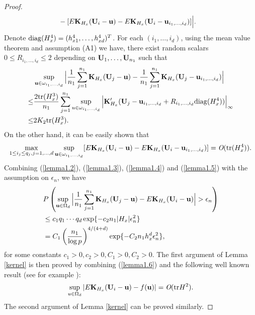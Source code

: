 \documentclass[11pt]{article}
\theoremstyle{definition}
\begin{document}
\begin{proof}
\begin{align}
 		&-[E{\bf K}_{H_x}({\bf U}_i-{\bf u})-E{\bf K}_{H_x}({\bf U}_i-{\bf u}_{i_1,\ldots,i_d})] \Big|. \nonumber
 	\end{align}
 	Denote ${\rm diag}(H^4_x)=(h^4_{x1},\ldots,h_{xd}^4)^T$. For each $(i_1,\ldots,i_d)$, using the mean value theorem and assumption (A1) we have, there exist random scalars $0\leq R_{i_1,\ldots,i_d}\leq 2$ depending on ${\bf U}_1,\ldots,{\bf U}_{n_1}$ such that
 	\begin{align}\label{lemma1.4}
 		&\sup_{{\bf u}\in\omega_{i_1,\ldots,i_d}}\Big|\frac{1}{n_1}\sum_{j=1}^{n_1}{\bf K}_{H_x}({\bf U}_j-{\bf u})-\frac{1}{n_1}\sum_{j=1}^{n_1}{\bf K}_{H_x}({\bf U}_j-{\bf u}_{i_1,\ldots,i_d}) \Big|   \\
 		\leq& \frac{2{\rm tr}(H^3_x)}{n_1}\sum_{j=1}^{n_1} \sup_{u\in\omega_{i_1,\ldots,i_d}}\Big|{\bf K}'_{H_x}({\bf U}_j-{\bf u}_{i_1,\ldots,i_d}+R_{i_1,\ldots,i_d}{\rm diag}(H_x^4))  \Big|_\infty \nonumber\\
 		\leq& 2K_2{\rm tr}(H^3_x). \nonumber
 	\end{align}
 	On the other hand, it can be easily shown that
 	\begin{equation}\label{lemma1.5}
 		\max_{1\leq i_j \leq q_j, j=1,\ldots,d}\sup_{{\bf u}\in\omega_{i_1,\ldots,i_d}}[E{\bf K}_{H_x}({\bf U}_i-{\bf u})-E{\bf K}_{H_x}({\bf U}_i-{\bf u}_{i_1,\ldots,i_d})] =\emph{O}({\rm tr}(H^4_x)).
 	\end{equation}
 	Combining (\ref{lemma1.2}), (\ref{lemma1.3}), (\ref{lemma1.4}) and (\ref{lemma1.5}) with the assumption on $\epsilon_n$, we have%
 	\begin{align}\label{lemma1.6}
 		&P\left(\sup_{{\bf u}\in \Omega_d}\Big|\frac{1}{n_1}\sum_{j=1}^{n_1}{\bf K}_{H_x}({\bf U}_j-{\bf u})-E{\bf K}_{H_x}({\bf U}_i-{\bf u})\Big|>\epsilon_n \right)  \\
 		&\leq c_1q_1\cdots q_d \exp\{-c_2n_1|H_x|\epsilon_n^2\}  \nonumber\\
 		&=C_1\left(\frac{n_1}{\log p}\right)^{4/(4+d)}\exp\{-C_2n_1h_x^{d}\epsilon_n^2\}, \nonumber
 	\end{align}
 	for  some constants $c_1>0, c_2>0, C_1>0, C_2>0$. %
 	The first argument of Lemma \ref{kernel} is then proved by combining (\ref{lemma1.6}) and the following well known result (see for example \cite{Pagan}):
 	\begin{eqnarray*}
 		\sup_{u\in \Omega_d}|E{\bf K}_{H_x}({\bf U}_i-{\bf u})-f({\bf u})|=\emph{O}({\rm tr}H^2).
 	\end{eqnarray*}
 	The second argument of Lemma \ref{kernel}  can be proved similarly.
 	
 \end{proof}
 
\end{document}
